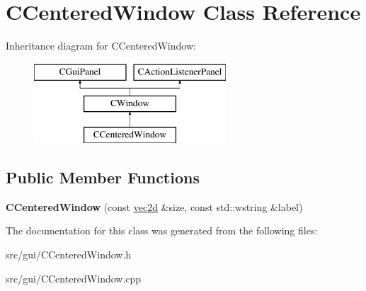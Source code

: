 \hypertarget{class_c_centered_window}{
\section{CCenteredWindow Class Reference}
\label{class_c_centered_window}
}
Inheritance diagram for CCenteredWindow:\begin{figure}[H]
\begin{center}
\leavevmode
\includegraphics[height=3.000000cm]{class_c_centered_window}
\end{center}
\end{figure}
\subsection*{Public Member Functions}
\begin{DoxyCompactItemize}
\item 
\hypertarget{class_c_centered_window_ade79256083d0fdeff7422d922f44cd13}{
{\bfseries CCenteredWindow} (const \hyperlink{classvec2d}{vec2d} \&size, const std::wstring \&label)}
\label{class_c_centered_window_ade79256083d0fdeff7422d922f44cd13}

\end{DoxyCompactItemize}


The documentation for this class was generated from the following files:\begin{DoxyCompactItemize}
\item 
src/gui/CCenteredWindow.h\item 
src/gui/CCenteredWindow.cpp\end{DoxyCompactItemize}
